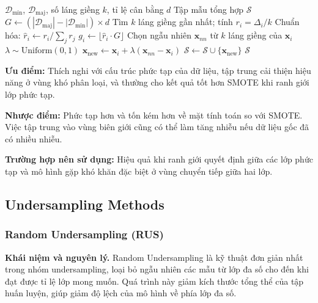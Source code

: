 \begin{algorithm}[H]
\caption{ADASYN}
\begin{algorithmic}[1]
  \Require $\mathcal{D}_{\min}$, $\mathcal{D}_{\text{maj}}$, số láng giềng $k$, tỉ lệ cân bằng $d$
  \Ensure Tập mẫu tổng hợp $\mathcal{S}$
  \State $G \leftarrow (|\mathcal{D}_{\text{maj}}| - |\mathcal{D}_{\min}|) \times d$
    \State Tìm $k$ láng giềng gần nhất; tính $r_i = \Delta_i / k$
  \EndFor
  \State Chuẩn hóa: $\hat{r}_i \leftarrow r_i / \sum_j r_j$
    \State $g_i \leftarrow \lfloor \hat{r}_i \cdot G \rfloor$
      \State Chọn ngẫu nhiên $\mathbf{x}_{nn}$ từ $k$ láng giềng của $\mathbf{x}_i$
      \State $\lambda \sim \mathrm{Uniform}(0,1)$
      \State $\mathbf{x}_{\text{new}} \leftarrow \mathbf{x}_i + \lambda(\mathbf{x}_{nn} - \mathbf{x}_i)$
      \State $\mathcal{S} \leftarrow \mathcal{S} \cup \{\mathbf{x}_{\text{new}}\}$
    \EndFor
  \EndFor
  \State \Return $\mathcal{S}$
\end{algorithmic}
\end{algorithm}

\textbf{Ưu điểm:} Thích nghi với cấu trúc phức tạp của dữ liệu, tập trung cải thiện hiệu năng ở vùng khó phân loại, và thường cho kết quả tốt hơn SMOTE khi ranh giới lớp phức tạp.

\textbf{Nhược điểm:} Phức tạp hơn và tốn kém hơn về mặt tính toán so với SMOTE. Việc tập trung vào vùng biên giới cũng có thể làm tăng nhiễu nếu dữ liệu gốc đã có nhiều nhiễu.

\textbf{Trường hợp nên sử dụng:} Hiệu quả khi ranh giới quyết định giữa các lớp phức tạp và mô hình gặp khó khăn đặc biệt ở vùng chuyển tiếp giữa hai lớp.

\subsection{Undersampling Methods}

\subsubsection{Random Undersampling (RUS)}

\textbf{Khái niệm và nguyên lý.}
Random Undersampling là kỹ thuật đơn giản nhất trong nhóm undersampling, loại bỏ ngẫu nhiên các mẫu từ lớp đa số cho đến khi đạt được tỉ lệ lớp mong muốn. Quá trình này giảm kích thước tổng thể của tập huấn luyện, giúp giảm độ lệch của mô hình về phía lớp đa số.

